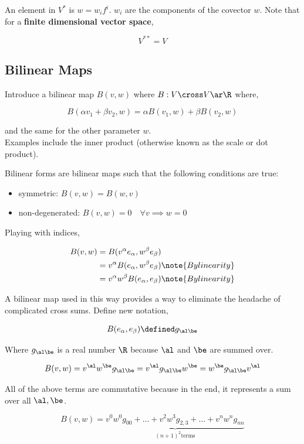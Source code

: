 \documentclass{article}
\begin{document}
An element in $V^*$ is $w = w_if^i$. $w_i$ are the components of the covector $w$. Note that for a \textbf{finite dimensional vector space},

\[ V^{**} = V \]

\subsection{Bilinear Maps}

Introduce a bilinear map $B(v, w)$ where $B: V \cross V \ar \R$ where,

\[ B(\alpha v_1 + \beta v_2, w) = \alpha B(v_1, w) + \beta B(v_2, w) \]

and the same for the other parameter $w$. \\

Examples include the inner product (otherwise known as the scale or dot product).

Bilinear forms are bilinear maps such that the following conditions are true:

\begin{itemize}
    \item symmetric: $B(v,w) = B(w,v)$
    \item non-degenerated: $B(v,w) = 0 \quad \forall v \implies w = 0$
\end{itemize}

Playing with indices,

\begin{align*}
    B(v,w) &= B(v^\alpha e_\alpha, w^\beta e_\beta) \\
           &= v^\alpha B( e_\alpha, w^\beta e_\beta) \note{By linearity} \\
           &= v^\alpha w^\beta B( e_\alpha, e_\beta) \note{By linearity}
\end{align*}

A bilinear map used in this way provides a way to eliminate the headache of complicated cross sums. Define new notation,

\[ B( e_\alpha, e_\beta) \defined g_{\al\be} \]

Where $g_{\al\be}$ is a real number $\R$ because $\al$ and $\be$ are summed over.

\[ B(v, w) = v^\al w^\be g_{\al\be} = v^\al g_{\al\be}w^\be =  w^\be g_{\al\be} v^\al \]

All of the above terms are commutative because in the end, it represents a sum over all $\al, \be$.

\[ B(v,w) = \underbrace{v^0w^0g_{00} + \ldots + v^2w^3g_{2,3} + \ldots + v^nw^ng_{nn}}_{(n+1)^2 \text{terms}} \]
\end{document}
